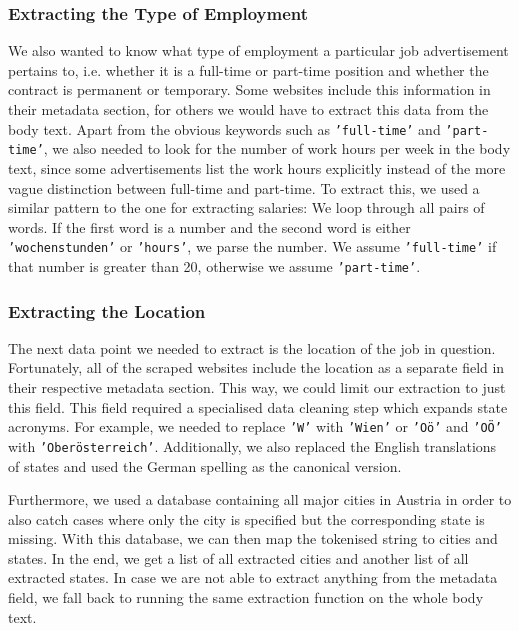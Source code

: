 \documentclass[runningheads]{llncs}
\begin{document}
\subsubsection{Extracting the Type of Employment}
\label{subsub:extracting_the_type_of_employment}

We also wanted to know what type of employment a particular job advertisement pertains to, i.e. whether it is a full-time or part-time position and whether the contract is permanent or temporary. Some websites include this information in their metadata section, for others we would have to extract this data from the body text. Apart from the obvious keywords such as \texttt{'full-time'} and \texttt{'part-time'}, we also needed to look for the number of work hours per week in the body text, since some advertisements list the work hours explicitly instead of the more vague distinction between full-time and part-time. To extract this, we used a similar pattern to the one for extracting salaries: We loop through all pairs of words. If the first word is a number and the second word is either \texttt{'wochenstunden'} or \texttt{'hours'}, we parse the number. We assume \texttt{'full-time'} if that number is greater than 20, otherwise we assume \texttt{'part-time'}.

\subsubsection{Extracting the Location}
\label{subsub:extracting_the_location}

The next data point we needed to extract is the location of the job in question. Fortunately, all of the scraped websites include the location as a separate field in their respective metadata section. This way, we could limit our extraction to just this field. This field required a specialised data cleaning step which expands state acronyms. For example, we needed to replace \texttt{'W'} with \texttt{'Wien'} or \texttt{'Oö'} and \texttt{'OÖ'} with \texttt{'Oberösterreich'}. Additionally, we also replaced the English translations of states and used the German spelling as the canonical version.

Furthermore, we used a database containing all major cities in Austria \cite{austria_cities_database} in order to also catch cases where only the city is specified but the corresponding state is missing. With this database, we can then map the tokenised string to cities and states. In the end, we get a list of all extracted cities and another list of all extracted states. In case we are not able to extract anything from the metadata field, we fall back to running the same extraction function on the whole body text.
\end{document}
